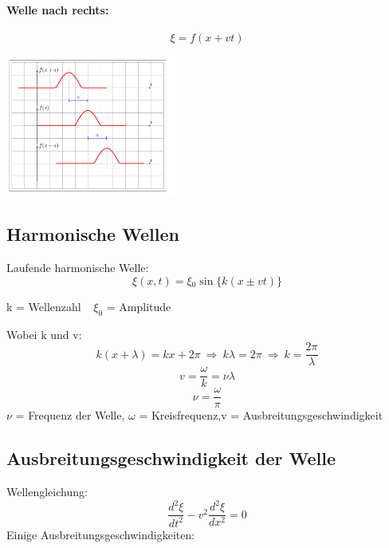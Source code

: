 \documentclass[7pt]{article}
\begin{document}
\begin{multicols*}{3}
\paragraph{Welle nach rechts:}
\begin{equation*}
\xi = f(x+vt) 
\end{equation*}
\begin{center}
	\includegraphics[width=160pt]{images/wellenrichtung.png}
\end{center}

\columnbreak


\subsection{Harmonische Wellen}
Laufende harmonische Welle:
\begin{equation*}
\xi(x,t) = \xi {_0} \sin\lbrace k(x\pm vt) \rbrace
\end{equation*}

k = Wellenzahl $\> \>$ 
$\xi_0$ = Amplitude\newline
\newline

Wobei k und v:
\begin{equation*}
k(x+\lambda) = kx + 2\pi \> \Longrightarrow  \> k\lambda = 2\pi \> \Longrightarrow \> k = \frac{2\pi}{\lambda}
\end{equation*}
\begin{equation*}
v = \frac{\omega}{k} = \nu\lambda
\end{equation*}
\begin{equation*}
\nu = \frac{\omega}{\pi}
\end{equation*}
$\nu$ = Frequenz der Welle, $\omega$ = Kreisfrequenz,\newline v = Ausbreitungsgeschwindigkeit



\subsection{Ausbreitungsgeschwindigkeit der Welle}
Wellengleichung:
\begin{equation*}
\frac{d^2\xi}{dt^2} - v^2\frac{d^2\xi}{dx^2} = 0 
\end{equation*}
\newline
Einige Ausbreitungsgeschwindigkeiten:


\end{multicols*}
\end{document}

